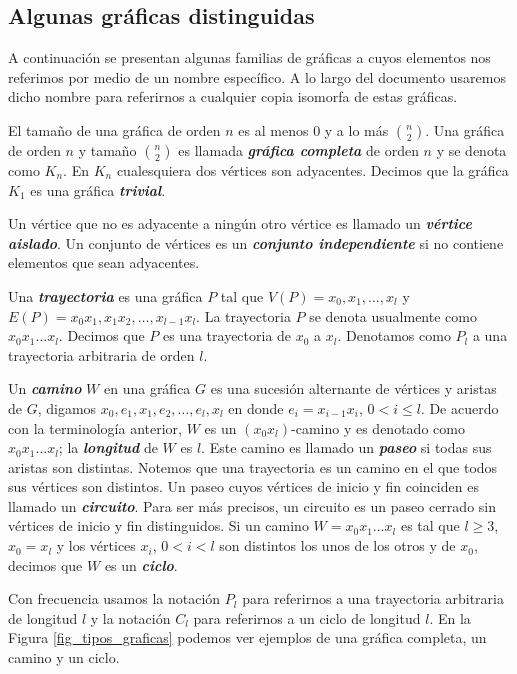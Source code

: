 \subsection{Algunas gráficas distinguidas}

A continuación se presentan algunas familias de gráficas a cuyos elementos nos referimos por medio de un nombre específico. A lo largo del documento usaremos dicho nombre para referirnos a cualquier copia isomorfa de estas gráficas.

El tamaño de una gráfica de orden $n$ es al menos $0$ y a lo más $\binom{n}{2}$. Una gráfica de orden $n$ y tamaño $\binom{n}{2}$ es llamada \textbf{\emph{gráfica completa}} de orden $n$ y se denota como $K_n$. En $K_n$ cualesquiera dos vértices son adyacentes. Decimos que la gráfica $K_1$ es una gráfica \textbf{\emph{trivial}}.

Un vértice que no es adyacente a ningún otro vértice es llamado un \textbf{\emph{vértice aislado}}. Un conjunto de vértices es un \textbf{\emph{conjunto independiente}} si no contiene elementos que sean adyacentes.

Una \textbf{\emph{trayectoria}} es una gráfica $P$ tal que $V(P) = {x_0,x_1,\dots,x_l}$ y $E(P) = {x_0x_1,x_1x_2,\dots,x_{l-1}x_l}$.
La trayectoria $P$ se denota usualmente como $x_0x_1\dots x_l$. Decimos que $P$ es una trayectoria de $x_0$ a $x_l$. Denotamos
como $P_l$ a una trayectoria arbitraria de orden $l$.

Un \textbf{\emph{camino}} $W$ en una gráfica $G$ es una sucesi\'on alternante de vértices y aristas de $G$, digamos $x_0, e_1, x_1, e_2, \dots, e_l, x_l$ en donde $e_i=x_{i-1}x_i$, $0<i\leq l$. De acuerdo con la terminología anterior, $W$ es un $(x_0 x_l)$-camino y es denotado como $x_0x_1\dots x_l$; la \textbf{\emph{longitud}} de $W$ es $l$. Este camino es llamado un  \textbf{\emph{paseo}} si todas sus aristas son distintas. Notemos que una trayectoria es un camino en el que todos sus vértices son distintos. Un paseo cuyos vértices de inicio y fin coinciden es llamado un \textbf{\emph{circuito}}. Para ser más precisos, un circuito es un paseo cerrado sin vértices de inicio y fin distinguidos. Si un camino $W = x_0x_1\dots x_l$ es tal que $l\geq 3$, $x_0=x_l$ y los vértices $x_i$, $0<i<l$ son distintos los unos de los otros y de $x_0$, decimos que $W$ es un \textbf{\emph{ciclo}}.

Con frecuencia usamos la notación $P_l$ para referirnos a una trayectoria arbitraria de longitud $l$ y la notación $C_l$ para referirnos a un ciclo de longitud $l$. En la Figura \ref{fig_tipos_graficas} podemos ver ejemplos de una gráfica completa, un camino y un ciclo.

